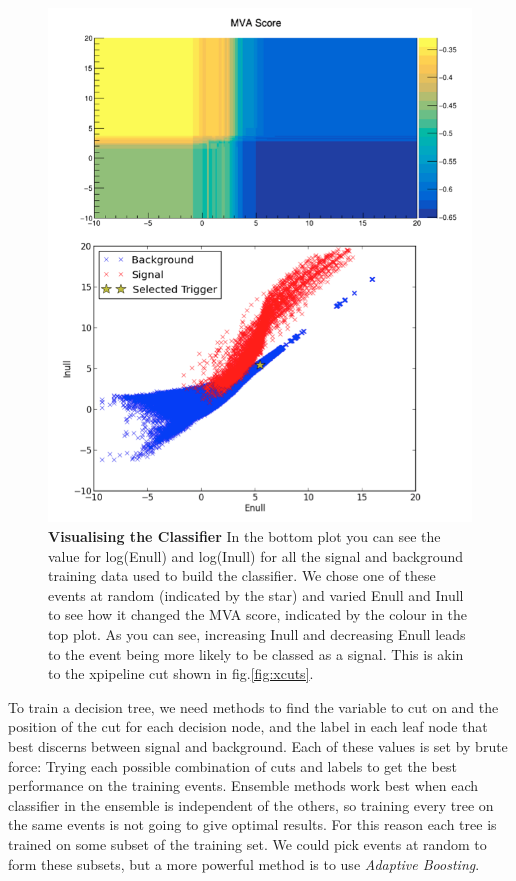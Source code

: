 \documentclass[11pt]{cuthesis}
\begin{document}
\begin{figure} %
\begin{center}
\includegraphics[width=0.8\linewidth]{mva_trigger_and_score.png}
\end{center}
\caption{\textbf{Visualising the Classifier} In the bottom plot you can see the value for log(Enull) and log(Inull) for all the signal and background training data used to build the classifier. We chose one of these events at random (indicated by the star) and varied Enull and Inull to see how it changed the MVA score, indicated by the colour in the top plot. As you can see, increasing Inull and decreasing Enull leads to the event being more likely to be classed as a signal. This is akin to the xpipeline cut shown in fig.\ref{fig:xcuts}. }
\label{fig:mvacuts}
\end{figure}


To train a decision tree, we need methods to find the variable to cut on and the position of the cut for each decision node, and the label in each leaf node that best discerns between signal and background. Each of these values is set by brute force: Trying each possible combination of cuts and labels to get the best performance on the training events. Ensemble methods work best when each classifier in the ensemble is independent of the others, so training every tree on the same events is not going to give optimal results. For this reason each tree is trained on some subset of the training set.  We could pick events at random to form these subsets, but a more powerful method is to use \textit{Adaptive Boosting}. 
\end{document}
